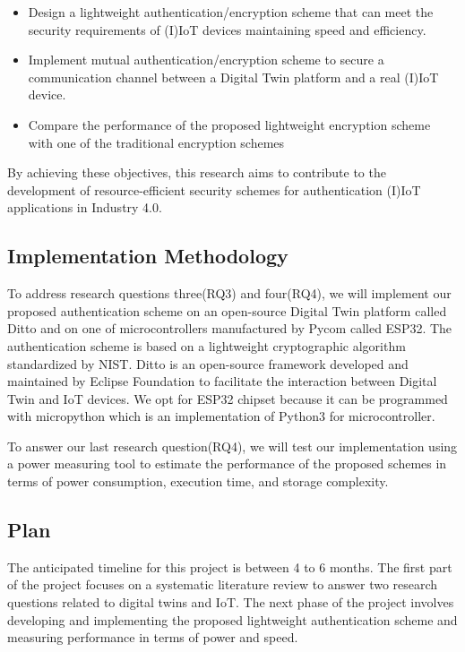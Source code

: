 \begin{itemize}

    \item Design a lightweight authentication/encryption scheme that can meet the security requirements of (I)IoT devices maintaining speed and efficiency.

    \item Implement mutual authentication/encryption scheme to secure a communication channel between a Digital Twin platform and a real (I)IoT device. 
    

    \item Compare the performance of the proposed lightweight encryption scheme with one of the traditional encryption schemes

\end{itemize}
By achieving these objectives, this research aims to contribute to the development of resource-efficient security schemes for authentication (I)IoT applications in Industry 4.0.




\subsection{Implementation Methodology}
To address research questions three(RQ3) and four(RQ4), we will implement our proposed authentication scheme on
an open-source Digital Twin platform called Ditto and on one of microcontrollers manufactured by
Pycom called ESP32. The authentication scheme is based on a lightweight cryptographic algorithm
standardized by NIST. Ditto is an open-source framework developed and maintained
by Eclipse Foundation to facilitate the interaction between Digital Twin and IoT devices\cite{noauthor_eclipse_nodate}. We opt
for ESP32 chipset because it can be programmed with micropython which is an implementation of
Python3 for microcontroller. 

To answer our last research question(RQ4), we will test our implementation
using a power measuring tool to estimate the performance of the proposed schemes in terms of power
consumption, execution time, and storage complexity. 

\subsection{Plan}
The anticipated timeline for this project is between 4 to 6 months. The first part of the project focuses on a systematic literature review to answer two research questions related to digital twins and IoT.  The next phase of the project involves developing and implementing the proposed lightweight authentication scheme and measuring performance in terms of power and speed.


